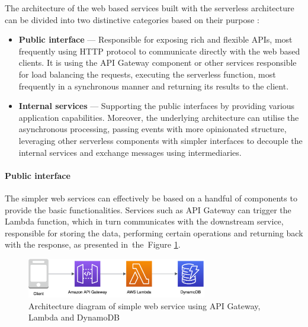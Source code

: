 The architecture of the web based services built with the serverless architecture can be divided into two distinctive categories based on their purpose \cite{AWSReinventBuildingMicroservicesWithAWSLambda}:

\begin{itemize}
   \item \textbf{Public interface} --- Responsible for exposing rich and flexible APIs, most frequently using HTTP protocol to communicate directly with the web based clients. It is using the API Gateway component or other services responsible for load balancing the requests, executing the serverless function, most frequently in a synchronous manner and returning its results to the client.
   \item \textbf{Internal services} --- Supporting the public interfaces by providing various application capabilities. Moreover, the underlying architecture can utilise the asynchronous processing, passing events with more opinionated structure, leveraging other serverless components with simpler interfaces to decouple the internal services and exchange messages using intermediaries.
\end{itemize}

\paragraph{Public interface} \label{chapter:public-interfaces}

The simpler web services can effectively be based on a handful of components to provide the basic functionalities. Services such as API Gateway can trigger the Lambda function, which in turn communicates with the downstream service, responsible for storing the data, performing certain operations and returning back with the response, as presented in~the~Figure \ref{fig:simple-web-service-diagram}.

\begin{figure}[H]
   \centering
   \includegraphics[width=0.7\textwidth]{assets/04-serverless-for-web-apps/simpleWebService.png}
   \caption{Architecture diagram of simple web service using API Gateway, Lambda and DynamoDB}
   \label{fig:simple-web-service-diagram}
\end{figure}

